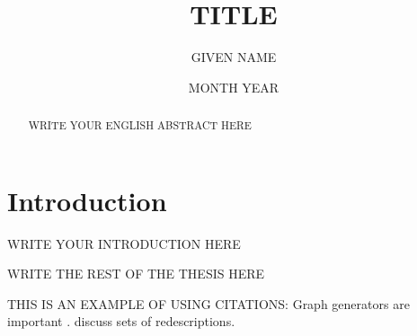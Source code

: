 \documentclass[mscthesis,english,oneside,biblatex]{uefcsthesis}
\title{TITLE} %
\author{GIVEN NAME}{FAMILY NAME} %
\date{MONTH YEAR} %
\begin{document}
\maketitle
\begin{abstract}
  WRITE YOUR ENGLISH ABSTRACT HERE
\end{abstract}

\frontmatter
\tableofcontents
\mainmatter

\chapter{Introduction}
\label{cha:intro}

WRITE YOUR INTRODUCTION HERE

WRITE THE REST OF THE THESIS HERE

THIS IS AN EXAMPLE OF USING CITATIONS:
Graph generators are important \citep{metzler18random}.
\citet{kalofolias18from} discuss sets of redescriptions.

\printbibliography[heading=bibintoc]

\backmatter %
\end{document}
